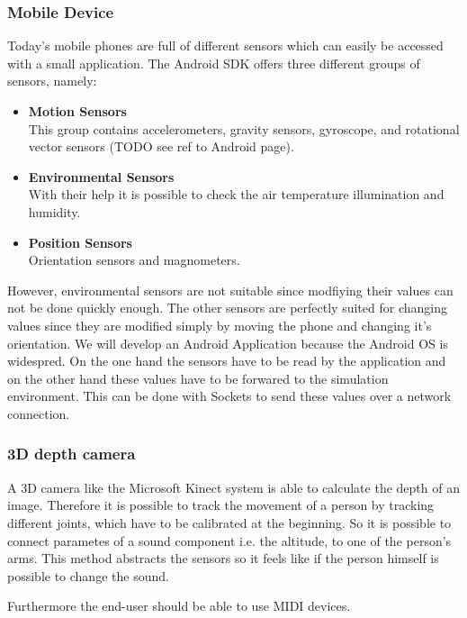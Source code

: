 \subsubsection{Mobile Device}
Today's mobile phones are full of different sensors which can easily be accessed with a small application. The Android SDK offers three different groups of sensors, namely:
\begin{itemize}
	\item \textbf{Motion Sensors} \\
			This group contains accelerometers, gravity sensors, gyroscope, and rotational vector sensors (TODO see ref to Android page). 
	\item \textbf{Environmental Sensors} \\
			With their help it is possible to check the air temperature illumination and humidity.
	\item \textbf{Position Sensors} \\
			Orientation sensors and magnometers.
\end{itemize}

However, environmental sensors are not suitable since modfiying their values can not be done quickly enough. The other sensors are perfectly suited for changing values since they are modified simply by moving the phone and changing it's orientation. We will develop an Android Application because the Android OS is widespred. On the one hand the sensors have to be read by the application and on the other hand these values have to be forwared to the simulation environment. This can be done with Sockets to send these values over a network connection.

\subsubsection{3D depth camera}
A 3D camera like the Microsoft Kinect system is able to calculate the depth of an image. Therefore it is possible to track the movement of a person by tracking different joints, which have to be calibrated at the beginning. So it is possible to connect parametes of a sound component i.e. the altitude, to one of the person's arms. This method abstracts the sensors so it feels like if the person himself is possible to change the sound.

Furthermore the end-user should be able to use MIDI devices.

